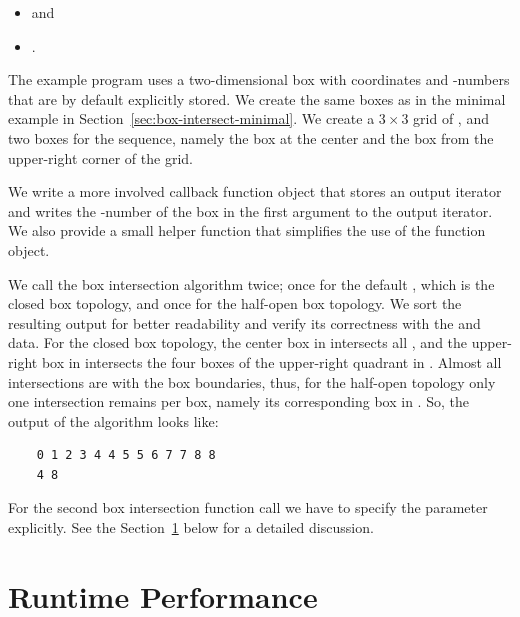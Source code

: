 \begin{itemize}
  \item {} and
  \item {}.
\end{itemize}

The example program uses a two-dimensional box with 
coordinates and -numbers that are by default explicitly
stored. We create the same boxes as in the minimal example in
Section~\ref{sec:box-intersect-minimal}. We create a $3 \times 3$ grid
of , and two boxes for the  sequence, namely the
box at the center and the box from the upper-right corner of the grid.

We write a more involved callback function object  that
stores an output iterator and writes the -number of the 
box in the first argument to the output iterator. We also provide a
small helper function  that simplifies the use of the function
object.

We call the box intersection algorithm twice; once for the default
, which is the closed box topology, and once for the
half-open box topology. We sort the resulting output for better
readability and verify its correctness with the  and
 data.  For the closed box topology, the center box in
 intersects all , and the upper-right box in
 intersects the four boxes of the upper-right quadrant in
. Almost all intersections are with the box boundaries,
thus, for the half-open topology only one intersection remains per
 box, namely its corresponding box in . So, the
output of the algorithm looks like:

\begin{verbatim}
    0 1 2 3 4 4 5 5 6 7 7 8 8 
    4 8 
\end{verbatim}

For the second box intersection function call we have to specify the
 parameter explicitly. See the
Section~\ref{sec:box-inters-performance} below for a detailed
discussion.



\section{Runtime Performance}\label{sec:box-inters-performance}

